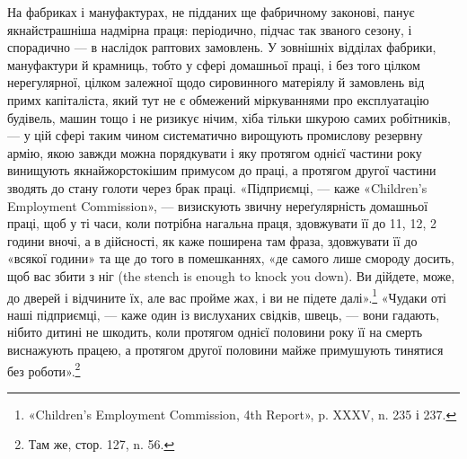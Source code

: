 На фабриках і мануфактурах, не підданих ще фабричному
законові, панує якнайстрашніша надмірна праця: періодично,
підчас так званого сезону, і спорадично — в наслідок раптових замовлень. У зовнішніх відділах
фабрики, мануфактури й
крамниць, тобто у сфері домашньої праці, і без того цілком нерегулярної, цілком залежної щодо
сировинного матеріялу й замовлень
від примх капіталіста, який тут не є обмежений міркуваннями
про експлуатацію будівель, машин тощо і не ризикує нічим, хіба
тільки шкурою самих робітників, — у цій сфері таким чином систематично вирощують промислову резервну
армію, якою завжди
можна порядкувати і яку протягом однієї частини року винищують якнайжорстокішим примусом до праці, а
протягом другої
частини зводять до стану голоти через брак праці. «Підприємці, — каже «Children’s Employment
Commission», — визискують
звичну нереґулярність домашньої праці, щоб у ті часи, коли
потрібна нагальна праця, здовжувати її до 11, 12, 2 години
вночі, а в дійсності, як каже поширена там фраза, здовжувати
її до «всякої години» та ще до того в помешканнях, «де самого
лише смороду досить, щоб вас збити з ніг (the stench is enough
to knock you down). Ви дійдете, може, до дверей і відчините їх,
але вас пройме жах, і ви не підете далі».\footnote{
«Children’s Employment Commission, 4th Report», p. XXXV,
n. 235 і 237.
} «Чудаки оті наші
підприємці, — каже один із вислуханих свідків, швець, — вони
гадають, нібито дитині не шкодить, коли протягом однієї половини року її на смерть виснажують
працею, а протягом другої
половини майже примушують тинятися без роботи».\footnote{
Там же, стор. 127, n. 56.
}

